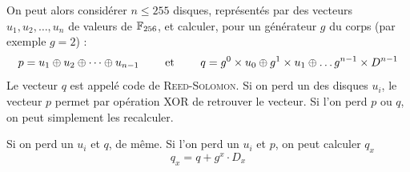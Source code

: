 \documentclass[a4paper,french,bookmarks]{article}
\begin{document}
    On peut alors considérer $n \leq 255$ disques, représentés par des vecteurs $u_1, u_2, \dots, u_n$ de valeurs de $\mathbb{F}_{256}$, et calculer, pour un générateur $g$ du corps (par exemple $g = 2$) :
    \[ p = u_1 \oplus u_2 \oplus \dots \oplus u_{n-1} \qquad\ \text{et} \ \qquad q = g^0 \times u_0 \oplus g^1 \times u_1 \oplus \dots g^{n-1} \times D^{n-1} \]
    Le vecteur $q$ est appelé code de \textsc{Reed-Solomon}. Si on perd un des disques $u_i$, le vecteur $p$ permet par opération XOR de retrouver le vecteur. Si l'on perd $p$ ou $q$, on peut simplement les recalculer.

    Si on perd un $u_i$ et $q$, de même. Si l'on perd un $u_i$ et $p$, on peut calculer $q_x$
    \[ q_x = q + g^x \cdot D_x\]

    \newpage
    


    \printbibliography[heading=bibintoc,title={Bibliographie}]
\end{document}
